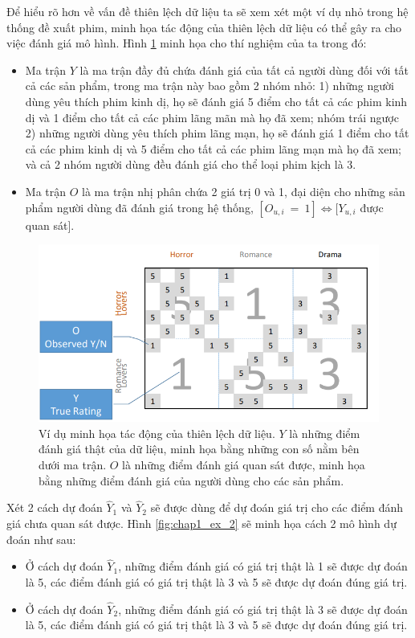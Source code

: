 Để hiểu rõ hơn về vấn đề thiên lệch dữ liệu ta sẽ xem xét một ví dụ nhỏ trong hệ thống đề xuất phim, minh họa tác động của thiên lệch dữ liệu có thể gây ra cho việc đánh giá mô hình. Hình \ref{fig:chap1_ex_1} minh họa cho thí nghiệm của ta trong đó:
\begin{itemize}
    \item Ma trận $Y$ là ma trận đầy đủ chứa đánh giá của tất cả người dùng đối với tất cả các sản phẩm, trong ma trận này bao gồm 2 nhóm nhỏ: 1) những người dùng yêu thích phim kinh dị, họ sẽ đánh giá 5 điểm cho tất cả các phim kinh dị và 1 điểm cho tất cả các phim lãng mãn mà họ đã xem; nhóm trái ngược 2) những người dùng yêu thích phim lãng mạn, họ sẽ đánh giá 1 điểm cho tất cả các phim kinh dị và 5 điểm cho tất cả các phim lãng mạn mà họ đã xem; và cả 2 nhóm người dùng đều đánh giá cho  thể loại phim kịch là 3. 
    \item Ma trận $O$ là ma trận nhị phân chứa 2 giá trị 0 và 1, đại diện cho những sản phẩm người dùng đã đánh giá trong hệ thống, \( [O_{u,i}~=~1]\Leftrightarrow[Y_{u,i} \) được quan sát].
\end{itemize}

\begin{figure}[h]
    \centering
    \includegraphics[width=\textwidth]{images/Chapter1/example_bias_1.png}
    \caption{Ví dụ minh họa tác động của thiên lệch dữ liệu. 
    $Y$ là những điểm đánh giá thật của dữ liệu, minh họa bằng những con số nằm bên dưới ma trận.
    $O$ là những điểm đánh giá quan sát được, minh họa bằng những điểm đánh giá của người dùng cho các sản phẩm.}
    \label{fig:chap1_ex_1}
\end{figure}

Xét 2 cách dự đoán $\hat{Y}_1$ và  $\hat{Y}_2$ sẽ được dùng để dự đoán giá trị cho các điểm đánh giá chưa quan sát được. Hình \ref{fig:chap1_ex_2} sẽ minh họa cách 2 mô hình dự đoán như sau:
\begin{itemize}
    \item Ở cách dự đoán $\hat{Y}_1$, những điểm đánh giá có giá trị thật là 1 sẽ được dự đoán là 5, các điểm đánh giá có giá trị thật là 3 và 5 sẽ được dự đoán đúng giá trị.
    \item Ở cách dự đoán $\hat{Y}_2$, những điểm đánh giá có giá trị thật là 3 sẽ được dự đoán là 5, các điểm đánh giá có giá trị thật là 3 và 5 sẽ được dự đoán đúng giá trị.
\end{itemize}


